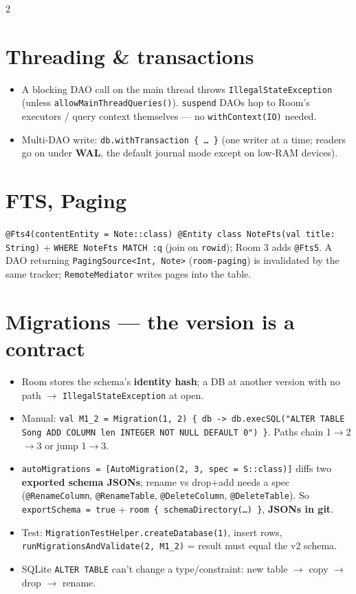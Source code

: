 \documentclass[8pt]{extarticle}
\newcommand\arr{\hbox{-}\hbox{>}}
\begin{document}
\begin{multicols}{2}
\section{Threading \& transactions}
\begin{itemize}\raggedright
  \item A blocking DAO call on the main thread throws \texttt{IllegalStateException} (unless
        \texttt{allowMainThreadQueries()}). \texttt{suspend} DAOs hop to Room's executors /
        query context themselves — no \texttt{withContext(IO)} needed.
  \item Multi-DAO write: \texttt{db.withTransaction \{ … \}} (one writer at a time; readers go on
        under \textbf{WAL}, the default journal mode except on low-RAM devices).
\end{itemize}

\section{FTS, Paging}
\raggedright \texttt{@Fts4(contentEntity = Note::class) @Entity class NoteFts(val title: String)}
+ \texttt{WHERE NoteFts MATCH :q} (join on \texttt{rowid}); Room 3 adds \texttt{@Fts5}. A DAO
returning \texttt{PagingSource<Int, Note>} (\texttt{room-paging}) is invalidated by the same
tracker; \texttt{RemoteMediator} writes pages into the table.

\columnbreak

\section{Migrations — the version is a contract}
\begin{itemize}\raggedright
  \item Room stores the schema's \textbf{identity hash}; a DB at another version with no path
        $\to$ \texttt{IllegalStateException} at open.
  \item Manual: \texttt{val M1\_2 = Migration(1, 2) \{ db \arr{} db.execSQL("ALTER TABLE Song ADD COLUMN
        len INTEGER NOT NULL DEFAULT 0") \}}. Paths chain 1$\to$2$\to$3 or jump 1$\to$3.
  \item \texttt{autoMigrations = [AutoMigration(2, 3, spec = S::class)]} diffs two
        \textbf{exported schema JSONs}; rename vs drop+add needs a spec (\texttt{@RenameColumn},
        \texttt{@RenameTable}, \texttt{@DeleteColumn}, \texttt{@DeleteTable}). So
        \texttt{exportSchema = true} + \texttt{room \{ schemaDirectory(…) \}}, \textbf{JSONs in git}.
  \item Test: \texttt{MigrationTestHelper.createDatabase(1)}, insert rows,
        \texttt{runMigrationsAndValidate(2, M1\_2)} = result must equal the v2 schema.
  \item SQLite \texttt{ALTER TABLE} can't change a type/constraint: new table $\to$ copy $\to$
        drop $\to$ rename.
\end{itemize}


\end{multicols}
\end{document}
